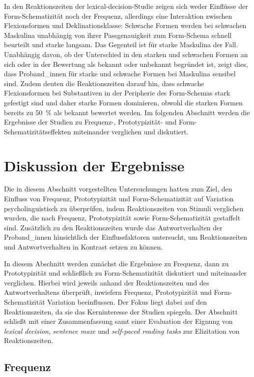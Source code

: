 In den Reaktionszeiten der lexical-decision-Studie zeigen sich weder Einflüsse der Form-Schematizität noch der Frequenz, allerdings eine Interaktion zwischen Flexionsformen und Deklinationsklasse: Schwache Formen werden bei schwachen Maskulina unabhängig von ihrer Passgenauigkeit zum Form-Schema schnell beurteilt und starke langsam. Das Gegenteil ist für starke Maskulina der Fall. Unabhängig davon, ob der Unterschied in den starken und schwachen Formen an sich oder in der Bewertung als bekannt oder unbekannt begründet ist, zeigt dies, dass Proband\_innen für starke und schwache Formen bei Maskulina sensibel sind. Zudem deuten die Reaktionszeiten darauf hin, dass schwache Flexionsformen bei Substantiven in der Peripherie des Form-Schemas stark gefestigt sind und daher starke Formen dominieren, obwohl die starken Formen bereits zu 50~\% als bekannt bewertet werden. 
Im folgenden Abschnitt werden die Ergebnisse der Studien zu Frequenz-, Prototypizität- und Form-Schematizitätseffekten miteinander verglichen und diskutiert.

\section{Diskussion der Ergebnisse}

Die in diesem Abschnitt vorgestellten Untersuchungen hatten zum Ziel, den Einfluss von Frequenz, Prototypizität und Form-Schematizität auf Variation psycholinguistisch zu überprüfen, indem Reaktionszeiten von Stimuli verglichen wurden, die nach Frequenz, Prototypizität sowie Form-Schematizität gestaffelt sind. Zusätzlich zu den Reaktionszeiten wurde das Antwortverhalten der Proband\_innen hinsichtlich der Einflussfaktoren untersucht, um Reaktionszeiten und Antwortverhalten in Kontrast setzen zu können. 


In diesem Abschnitt werden zunächst die Ergebnisse zu Frequenz, dann zu Prototypizität und schließlich zu Form-Schematizität diskutiert und miteinander verglichen. Hierbei wird jeweils anhand der Reaktionszeiten und des Antwortverhaltens überprüft, inwiefern Frequenz, Prototypizität und Form-Schematizität Variation beeinflussen. Der Fokus liegt dabei auf den Reaktionszeiten, da sie das Kerninteresse der Studien spiegeln. Der Abschnitt schließt mit einer Zusammenfassung samt einer Evaluation der Eignung von \textit{lexical decision}, \textit{sentence maze} und \textit{self-paced reading tasks} zur Elizitation von Reaktionszeiten. 

\subsection{Frequenz}\largerpage

